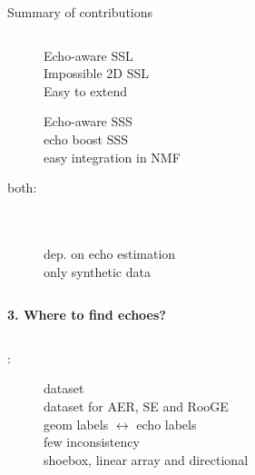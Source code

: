 \begin{frame}{Summary of contributions}
\begin{columns}[T]
        \pause
        \begin{column}{0.48\textwidth}
            \begin{description}
                \item[\mirage] Echo-aware SSL {\footnotesize
                \\\cmark{} Impossible 2D SSL
                \\\cmark{} Easy to extend
                }
                \pause
                \item[\separake] Echo-aware SSS {\footnotesize
                \\\cmark{} echo boost SSS
                \\\cmark{} easy integration in NMF
                }
                \pause
                \item[both:] \\{\footnotesize
                \\dep. on echo estimation
                \\only synthetic data}
            \end{description}


        \end{column}
    \end{columns}

    \pause
    \begin{center}
        \textbf{3. Where to find echoes?}
        \begin{columns}[T,onlytextwidth]
            \begin{description}
                \item[\dechorate:] dataset {\footnotesize%
                \\\cmark{} dataset for AER, SE and RooGE
                \\\cmark{} geom labels $\leftrightarrow$ echo labels
                \\\xmark{} few inconsistency
                \\\xmark{} shoebox, linear array and directional
                }
            \end{description}


\end{columns}
\end{center}
\end{frame}
